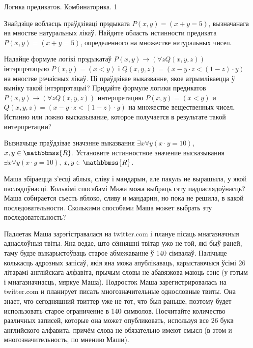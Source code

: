 



{Логика предикатов. Комбинаторика.}
{1}

\begin{problemList}

\problemItemSimple
{Знайдзіце вобласць праўдзіваці прэдыката $P(x, y) = (x + y = 5)$, вызначанага на мностве натуральных лікаў.}
{Найдите область истинности предиката $P(x, y) = (x + y = 5)$, определенного на множестве натуральных чисел.}

\bigskip

\problemItemSimple
{Надайце формуле логікі прэдыкатаў $P(x, y) \to (\forall{ z Q(x, y, z)})$ інтэрпрэтацыю $P(x, y) = (x < y)$ і $Q(x, y, z) = (x - y \cdot z < (1 - z) \cdot y)$ на мностве рэчаісных лікаў.
Ці праўдзівае выказванне, якое атрымліваецца ў выніку такой інтэрпрэтацыі?}
{Придайте формуле логики предикатов $P(x, y) \to (\forall{ z Q(x, y, z)})$ интерпретацию $P(x, y) = (x < y)$ и $Q(x, y, z) = (x - y \cdot z < (1 - z) \cdot y)$ на множестве вещественных чисел.
Истинно или ложно высказывание, которое получается в результате такой интерпретации?}

\bigskip

\problemItemSimple
{Вызначыце праўдзівае значэнне выказвання $\exists{x \forall{y {(x \cdot y = 10)}}}$, $x, y \in \mathbbmss{R}$.}
{Установите истинностное значение высказывания $\exists{x \forall{y {(x \cdot y = 10)}}}$, $x, y \in \mathbbmss{R}$.}

\bigskip

\problemItemSimple
{Маша збіраецца з'есці аблык, сліву і мандарын, але пакуль  не вырашыла, у якой паслядоўнасці.
Колькімі спосабамі Мажа можа выбраць гэту падпаслядоўнасць?}
{Маша собирается съесть яблоко, сливу и мандарин, но пока не решила, в какой последовательности.
Сколькими способами Маша может выбрать эту последовательность?}

\bigskip

\problemItemSimple
{Падлетак Маша зарэгістравалася на twitter.com і плануе пісаць мнагазначныя аднаслоўныя твіты.
Яна ведае, што сённяшні твітар ужо не той, які быў раней, таму будзе выкарыстоўваць старое абмежаванне ў 140 сімвалаў.
Палічыце колькасць адрозных запісаў, якія яна можа апублікаваць, карыстаючыся ўсімі 26 літарамі англійскага алфавіта,
прычым словы не абавязкова маюць сэнс (у гэтым і мнагазначнасць, мяркуе Маша).}
{Подросток Маша зарегистрировалась на twitter.com и планирует писать многозначительные однословные твиты.
Она знает, что сегодняшний твиттер уже не тот, что был раньше, поэтому будет использовать старое ограничение в 140 символов.
Посчитайте количество различных записей, которые она может опубликовать, используя все 26 букв английского алфавита,
причём слова не обязательно имеют смысл (в этом и многозначительность, по мнению Маши).}


\end{problemList}
